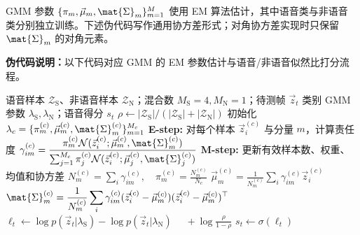 \documentclass[a4paper]{article}
\begin{document}
GMM 参数 $\{\pi_m,\vec{\mu}_m,\mat{\Sigma}_m\}_{m=1}^{M}$ 使用 EM 算法估计，其中语音类与非语音
类分别独立训练。下述伪代码写作通用协方差形式；对角协方差实现时只保留 $\mat{\Sigma}_m$ 的对角元素。

\textbf{伪代码说明：}以下代码对应 GMM 的 EM 参数估计与语音/非语音似然比打分流程。

\begin{algorithm}[ht]
  \caption{GMM 的 EM 参数估计与帧级打分}
  \label{alg:gmm-em}
  \begin{algorithmic}[1]
    \Require 语音样本 $\mathcal{Z}_{\mathrm{S}}$、非语音样本 $\mathcal{Z}_{\mathrm{N}}$；混合数 $M_{\mathrm{S}}=4,M_{\mathrm{N}}=1$；待测帧 $\vec{z}_t$
    \Ensure 类别 GMM 参数 $\lambda_{\mathrm{S}},\lambda_{\mathrm{N}}$；语音得分 $s_t$
    \State $\rho\gets |\mathcal{Z}_{\mathrm{S}}|/(|\mathcal{Z}_{\mathrm{S}}|+|\mathcal{Z}_{\mathrm{N}}|)$
      \State 初始化 $\lambda_c=\{\pi_m^{(c)},\vec{\mu}_m^{(c)},\mat{\Sigma}_m^{(c)}\}_{m=1}^{M_c}$
      \Repeat
        \State \textbf{E-step:} 对每个样本 $\vec{z}_i^{(c)}$ 与分量 $m$，计算责任度
        \Statex \hspace{\algorithmicindent}
        $\displaystyle
        \gamma_{im}^{(c)} =
        \frac{\pi_m^{(c)}\mathcal{N}(\vec{z}_i^{(c)};\vec{\mu}_m^{(c)},\mat{\Sigma}_m^{(c)})}
        {\sum_{j=1}^{M_c}\pi_j^{(c)}\mathcal{N}(\vec{z}_i^{(c)};\vec{\mu}_j^{(c)},\mat{\Sigma}_j^{(c)})}$
        \State \textbf{M-step:} 更新有效样本数、权重、均值和协方差
        \Statex \hspace{\algorithmicindent}
        $\displaystyle
        N_m^{(c)}=\sum_i\gamma_{im}^{(c)},\quad
        \pi_m^{(c)}=\frac{N_m^{(c)}}{N_c}$
        \Statex \hspace{\algorithmicindent}
        $\displaystyle
        \vec{\mu}_m^{(c)}=\frac{1}{N_m^{(c)}}\sum_i\gamma_{im}^{(c)}\vec{z}_i^{(c)}$
        \Statex \hspace{\algorithmicindent}
        $\displaystyle
        \mat{\Sigma}_m^{(c)}=
        \frac{1}{N_m^{(c)}}\sum_i\gamma_{im}^{(c)}
        (\vec{z}_i^{(c)}-\vec{\mu}_m^{(c)})(\vec{z}_i^{(c)}-\vec{\mu}_m^{(c)})^\top$
    \EndFor
    \State $\ell_t\gets \log p(\vec{z}_t|\lambda_{\mathrm{S}})-\log p(\vec{z}_t|\lambda_{\mathrm{N}})$
    \Statex \hspace{\algorithmicindent}$\displaystyle\quad + \log\frac{\rho}{1-\rho}$
    \State $s_t\gets \sigma(\ell_t)$
  \end{algorithmic}
\end{algorithm}
\end{document}
